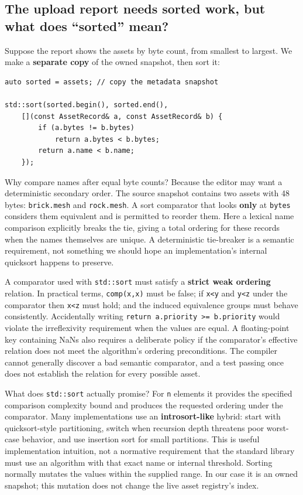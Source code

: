 \subsection{The upload report needs sorted work, but what does ``sorted'' mean?}\label{01-foundations-i-ch006-the-upload-report-needs-sorted-work-but-what-does-sorted-mean}

Suppose the report shows the assets by byte count, from smallest to largest. We make a \textbf{separate copy} of the owned snapshot, then sort it:

\begin{verbatim}
auto sorted = assets; // copy the metadata snapshot

std::sort(sorted.begin(), sorted.end(),
    [](const AssetRecord& a, const AssetRecord& b) {
        if (a.bytes != b.bytes)
            return a.bytes < b.bytes;
        return a.name < b.name;
    });
\end{verbatim}

Why compare names after equal byte counts? Because the editor may want a deterministic secondary order. The source snapshot contains two assets with 48 bytes: \texttt{brick.mesh} and \texttt{rock.mesh}. A sort comparator that looks \textbf{only} at \texttt{bytes} considers them equivalent and is permitted to reorder them. Here a lexical name comparison explicitly breaks the tie, giving a total ordering for these records when the names themselves are unique. A deterministic tie-breaker is a semantic requirement, not something we should hope an implementation's internal quicksort happens to preserve.

A comparator used with \texttt{std::sort} must satisfy a \textbf{strict weak ordering} relation. In practical terms, \texttt{comp(x,x)} must be false; if \texttt{x\textless{}y} and \texttt{y\textless{}z} under the comparator then \texttt{x\textless{}z} must hold; and the induced equivalence groups must behave consistently. Accidentally writing \texttt{return\ a.priority\ \textgreater{}=\ b.priority} would violate the irreflexivity requirement when the values are equal. A floating-point key containing NaNs also requires a deliberate policy if the comparator's effective relation does not meet the algorithm's ordering preconditions. The compiler cannot generally discover a bad semantic comparator, and a test passing once does not establish the relation for every possible asset.

What does \texttt{std::sort} actually promise? For \texttt{n} elements it provides the specified comparison complexity bound and produces the requested ordering under the comparator. Many implementations use an \textbf{introsort-like} hybrid: start with quicksort-style partitioning, switch when recursion depth threatens poor worst-case behavior, and use insertion sort for small partitions. This is useful implementation intuition, not a normative requirement that the standard library must use an algorithm with that exact name or internal threshold. Sorting normally mutates the values within the supplied range. In our case it is an owned snapshot; this mutation does not change the live asset registry's index.

